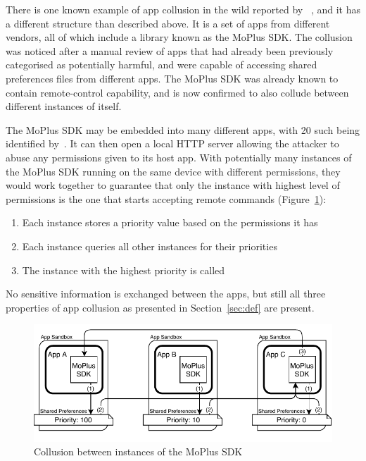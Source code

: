 \documentclass[article]{aaltoseries}
\newcommand{\Fref}[1]{Figure~\ref{#1}}
\newcommand{\Sref}[1]{Section~\ref{#1}}
\begin{document}
There is one known example of app collusion in the wild reported by \citeauthor{Blasco2016}~\cite{Blasco2016}, and it has a different structure than described above. It is a set of apps from different vendors, all of which include a library known as the MoPlus SDK. The collusion was noticed after a manual review of apps that had already been previously categorised as potentially harmful, and were capable of accessing shared preferences files from different apps. The MoPlus SDK was already known to contain remote-control capability, and is now confirmed to also collude between different instances of itself.

The MoPlus SDK may be embedded into many different apps, with 20 such being identified by~\cite{Blasco2016}. It can then open a local HTTP server allowing the attacker to abuse any permissions given to its host app. With potentially many instances of the MoPlus SDK running on the same device with different permissions, they would work together to guarantee that only the instance with highest level of permissions is the one that starts accepting remote commands (\Fref{fig:moplus}):
\begin{enumerate}[nosep,label={(\arabic*)}]
	\item Each instance stores a priority value based on the permissions it has
	\item Each instance queries all other instances for their priorities
	\item The instance with the highest priority is called
\end{enumerate}
No sensitive information is exchanged between the apps, but still all three properties of app collusion as presented in \Sref{sec:def} are present.

\begin{figure}[t]
	\centering
	\includegraphics[width=1.0\textwidth]{figures/Collusion2}
	\caption{Collusion between instances of the MoPlus SDK~\cite{Blasco2016}}
	\label{fig:moplus}
\end{figure}
\end{document}
